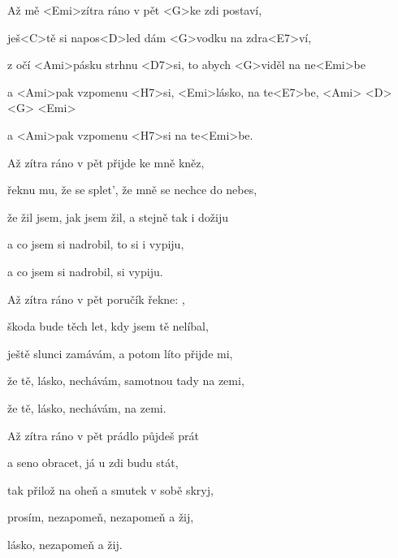 

\zs
Až mě <Emi>zítra ráno v pět
<G>ke zdi postaví,

ješ<C>tě si napos<D>led
dám <G>vodku na zdra<E7>ví,

z očí <Ami>pásku strhnu <D7>si, to
abych <G>viděl na ne<Emi>be

a <Ami>pak vzpomenu <H7>si,
<Emi>lásko, na te<E7>be,
<Ami> <D> <G> <Emi>

a <Ami>pak vzpomenu <H7>si na te<Emi>be.
\ks

\zs
Až zítra ráno v pět přijde ke mně kněz,

řeknu mu, že se splet', že mně se nechce do nebes,

že žil jsem, jak jsem žil, a stejně tak i dožiju

a co jsem si nadrobil, to si i vypiju,

a co jsem si nadrobil, si vypiju.
\ks

\zs
Až zítra ráno v pět poručík řekne: ,

škoda bude těch let, kdy jsem tě nelíbal,

ještě slunci zamávám, a potom líto přijde mi,

že tě, lásko, nechávám, samotnou tady na zemi,

že tě, lásko, nechávám, na zemi.
\ks

\zs
Až zítra ráno v pět prádlo půjdeš prát

a seno obracet, já u zdi budu stát,

tak přilož na oheň a smutek v sobě skryj,

prosím, nezapomeň, nezapomeň a žij,

lásko, nezapomeň a žij.
\ks

\kp
